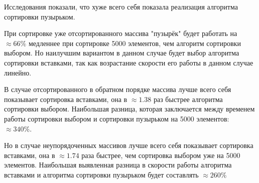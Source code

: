 \documentclass[12pt]{report}
\begin{document}
Исследования показали, что хуже всего себя показала реализация алгоритма сортировки пузырьком.

При сортировке уже отсортированного массива "пузырёк" будет работать на $\approx 66\%$ медленнее при сортировке 5000 элементов, чем алгоритм сортировки выбором. Но наилучшим вариантом в данном случае будет выбор алгоритма сортировки вставками, так как возрастание скорости его работы в данном случае линейно.

В случае отсортированного в обратном порядке массива лучше всего себя показывает сортировка вставками, она в $\approx 1.38$ раз быстрее алгоритма сортировки выбором. Наибольшая разница, которая заключается между временем работы сортировки выбором и сортировки пузырьком на 5000 элементов: $\approx 340\%$.

Но в случае неупорядоченных массивов лучше всего себя показывает сортировка вставками, она в $\approx 1.74$ раза быстрее, чем сортировка выбором уже на 5000 элементов. Наибольшая выявленная разница в скорости работы алгоритма вставками и алгоритма сортировки пузырьком будет составлять $\approx 260\%$

\end{document}
